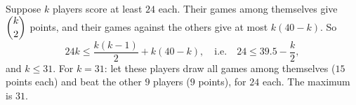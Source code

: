 Suppose $k$ players score at least $24$ each. Their games among themselves give $\dbinom k2$ points, and their games against the others give at most $k(40-k)$. So
\[24k\le\dfrac{k(k-1)}{2}+k(40-k),\quad\text{i.e.}\quad24\le39.5-\dfrac k2,\]
and $k\le31$. For $k=31$: let these players draw all games among themselves ($15$ points each) and beat the other $9$ players ($9$ points), for $24$ each. The maximum is $\boxed{31}$.
